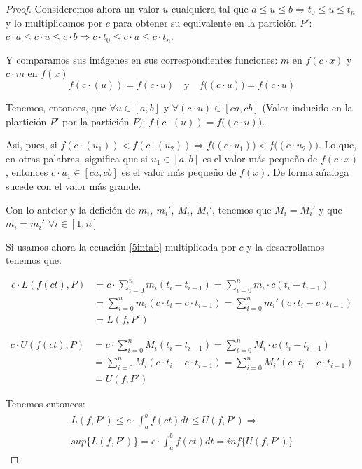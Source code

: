 \documentclass[12pt]{article}
\begin{document}
\begin{proof}
    Consideremos ahora un valor $u$ cualquiera tal que \(a\leq u\leq b \Longrightarrow t_{0}\leq u\leq t_n\) y lo multiplicamos por $c$ para obtener su equivalente en la partici\'on $P'$: \(c\cdot a\leq c\cdot u\leq c\cdot b \Longrightarrow c\cdot t_{0}\leq c\cdot u\leq c\cdot t_n\).\bigskip

    Y comparamos sus im\'agenes en sus correspondientes funciones: $m$ en \(f(c\cdot x)\) y $c\cdot m$ en \(f(x)\)
    \[f(c\cdot (u))=f(c\cdot u) \quad \text{y}  \quad f\big((c\cdot u)\big)=f(c\cdot u)\]

    Tenemos, entonces, que \(\forall u\in[a,b]\) y \(\forall (c\cdot u) \in [ca,cb]\) (Valor inducido en la plartici\'on $P'$ por la partici\'on $P$): \(f(c\cdot (u))=f\big((c\cdot u)\big)\).\bigskip

    Asi, pues, si \(f(c\cdot (u_1))<f(c\cdot (u_2)) \Longrightarrow f\big((c\cdot u_1)\big)<f\big((c\cdot u_2)\big)\). Lo que, en otras palabras, significa que si \(u_1\in[a,b]\) es el valor m\'as pequeño de $f(c\cdot x)$, entonces \(c\cdot u_1\in[ca,cb]\) es el valor m\'as pequeño de $f(x)$. De forma a\'naloga sucede con el valor m\'as grande.\bigskip

    Con lo anteior y la defici\'on de \(m_i, \ m_i', \ M_i, \ M_i'\), tenemos que \(M_i=M_i'\) y que \(m_i=m_i'\) \(\forall i\in[1,n]\)

    Si usamos ahora la ecuaci\'on \eqref{5intab} multiplicada por $c$ y la desarrollamos tenemos que:

    \begin{align*}
        c\cdot L(f(ct),P) &= c \cdot \sum_{i=0}^n m_i(t_i-t_{i-1}) = \sum_{i=0}^n m_i\cdot c(t_i-t_{i-1}) \\
        &= \sum_{i=0}^n m_i(c\cdot t_i-c\cdot t_{i-1}) = \sum_{i=0}^n m_i'(c\cdot t_i-c\cdot t_{i-1}) \\
        &= L(f,P')
    \end{align*}

    \begin{align*}
        c\cdot U(f(ct),P) &= c \cdot \sum_{i=0}^n M_i(t_i-t_{i-1}) = \sum_{i=0}^n M_i\cdot c(t_i-t_{i-1}) \\
        &= \sum_{i=0}^n M_i(c\cdot t_i-c\cdot t_{i-1}) = \sum_{i=0}^n M_i'(c\cdot t_i-c\cdot t_{i-1}) \\
        &= U(f,P')
    \end{align*}

    Tenemos entonces:
    \begin{multline*}
        L(f,P')\leq c\cdot\int_{a}^{b}f(ct)dt\leq U(f,P') \Longrightarrow \\ sup\{L(f,P')\}=c\cdot\int_{a}^{b}f(ct)dt=inf\{U(f,P')\}
    \end{multline*}


\end{proof}
\end{document}

